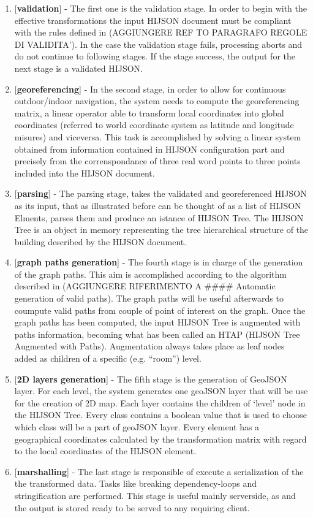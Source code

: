 \documentclass[]{article}
\begin{document}
\begin{enumerate}
\def\labelenumi{\arabic{enumi}.}
\itemsep1pt\parskip0pt
\item
  {[}\textbf{validation}{]} - The first one is the validation stage. In
  order to begin with the effective transformations the input HIJSON
  document must be compliant with the rules defined in (AGGIUNGERE REF
  TO PARAGRAFO REGOLE DI VALIDITA'). In the case the validation stage
  fails, processing aborts and do not continue to following stages. If
  the stage success, the output for the next stage is a validated
  HIJSON.
\item
  {[}\textbf{georeferencing}{]} - In the second stage, in order to allow
  for continuous outdoor/indoor navigation, the system needs to compute
  the georeferencing matrix, a linear operator able to transform local
  coordinates into global coordinates (referred to world coordinate
  system as latitude and longitude misures) and viceversa. This task is
  accomplished by solving a linear system obtained from information
  contained in HIJSON configuration part and precisely from the
  correnspondance of three real word points to three points included
  into the HIJSON document.
\item
  {[}\textbf{parsing}{]} - The parsing stage, takes the validated and
  georeferenced HIJSON as its input, that as illustrated before can be
  thought of as a list of HIJSON Elments, parses them and produce an
  istance of HIJSON Tree. The HIJSON Tree is an object in memory
  representing the tree hierarchical structure of the building described
  by the HIJSON document.
\item
  {[}\textbf{graph paths generation}{]} - The fourth stage is in charge
  of the generation of the graph paths. This aim is accomplished
  according to the algorithm described in (AGGIUNGERE RIFERIMENTO A
  \#\#\#\# Automatic generation of valid paths). The graph paths will be
  useful afterwards to coumpute valid paths from couple of point of
  interest on the graph. Once the graph paths has been computed, the
  input HIJSON Tree is augmented with paths information, becoming what
  has been called an HTAP (HIJSON Tree Augmented with Paths).
  Augmentation always takes place as leaf nodes added as children of a
  specific (e.g. ``room'') level.
\item
  {[}\textbf{2D layers generation}{]} - The fifth stage is the
  generation of GeoJSON layer. For each level, the system generates one
  geoJSON layer that will be use for the creation of 2D map. Each layer
  contains the children of `level' node in the HIJSON Tree. Every class
  contains a boolean value that is used to choose which class will be a
  part of geoJSON layer. Every element has a geographical coordinates
  calculated by the transformation matrix with regard to the local
  coordinates of the HIJSON element.
\item
  {[}\textbf{marshalling}{]} - The last stage is responsible of execute
  a serialization of the the transformed data. Tasks like breaking
  dependency-loops and stringification are performed. This stage is
  useful mainly serverside, as and the output is stored ready to be
  served to any requiring client.
\end{enumerate}
\end{document}
